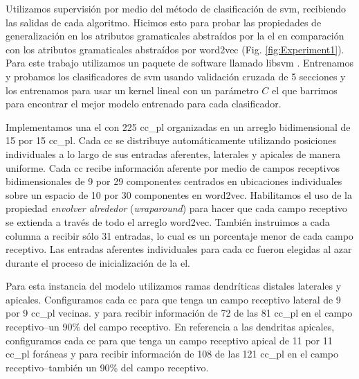 {Utilizamos supervisión por medio del método de clasificación de \gls{svm}, recibiendo las salidas de cada algoritmo.
Hicimos esto para probar las propiedades de generalización en los atributos gramaticales abstraídos por la \gls{el} en comparación con los atributos gramaticales abstraídos por word2vec (Fig. \ref{fig:Experiment1}).
Para este trabajo utilizamos un paquete de software llamado \gls{libsvm} \cite{CC01a, libsvm}.
Entrenamos y probamos los clasificadores de \gls{svm} usando validación cruzada de 5 secciones y los entrenamos para usar un kernel lineal con un parámetro $C$ el que barrimos para encontrar el mejor modelo entrenado para cada clasificador.

Implementamos una \gls{el} con 225 \gls{cc_pl} organizadas en un arreglo bidimensional de 15 por 15 \gls{cc_pl}.
Cada \gls{cc} se distribuye automáticamente utilizando posiciones individuales a lo largo de sus entradas aferentes, laterales y apicales de manera uniforme.
Cada \gls{cc} recibe información aferente por medio de campos receptivos bidimensionales de 9 por 29 componentes centrados en ubicaciones individuales sobre un espacio de 10 por 30 componentes en word2vec.
Habilitamos el uso de la propiedad \emph{envolver alrededor} (\emph{wraparound}) para hacer que cada campo receptivo se extienda a través de todo el arreglo word2vec.
También instruimos a cada columna a recibir sólo 31 entradas, lo cual es un porcentaje menor de cada campo receptivo.
Las entradas aferentes individuales para cada \gls{cc} fueron elegidas al azar durante el proceso de inicialización de la \gls{el}.

Para esta instancia del modelo utilizamos ramas dendríticas distales laterales y apicales.
Configuramos cada \gls{cc} para que tenga un campo receptivo lateral de 9 por 9 \gls{cc_pl} vecinas.
y para recibir información de 72 de las 81 \gls{cc_pl} en el campo receptivo--un 90\% del campo receptivo.
En referencia a las dendritas apicales, configuramos cada \gls{cc} para que tenga un campo receptivo apical de 11 por 11 \gls{cc_pl} foráneas y para recibir información de 108 de las 121 \gls{cc_pl} en el campo receptivo--también un 90\% del campo receptivo.

}
